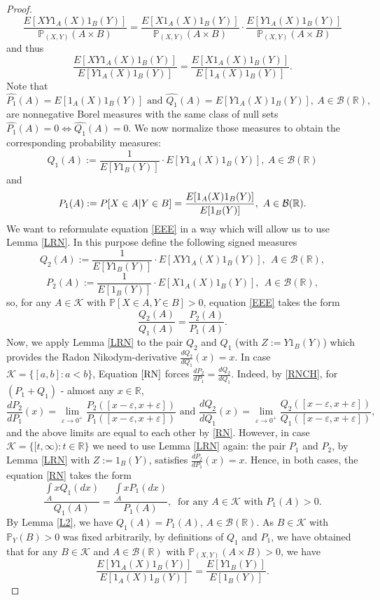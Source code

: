\documentclass[10pt,a4paper]{amsart}
\newcommand{\B}{\mathcal{B}(\R)}
\newcommand{\KK}{\mathcal{K}}
\newcommand{\PP}{\mathbb{P}}
\newcommand{\R}{\mathbb{R}}
\newcommand{\eps}{\varepsilon}
\begin{document}
\begin{proof}
$$\frac{E[XY1_A(X)1_B(Y)]}{\PP_{(X,Y)}(A\times B)}=\frac{E[X1_A(X)1_B(Y)]}{\PP_{(X,Y)}(A\times B)}\cdot \frac{E[Y1_A(X)1_B(Y)]}{\PP_{(X,Y)}(A\times B)}$$
and thus
\begin{equation}\label{EEE}
\frac{E[XY1_A(X)1_B(Y)]}{E[Y1_A(X)1_B(Y)]}=\frac{E[X1_A(X)1_B(Y)]}{E[1_A(X)1_B(Y)]}.
\end{equation}
 Note that 
$$\hat{P_1}(A)=E[1_A(X)1_B(Y)]\mbox{ and }\hat{Q_1}(A)= E[Y1_A(X)1_B(Y)],\ A\in\B,$$ are nonnegative Borel measures with the same class of null sets $\hat{P_1}(A)=0\Leftrightarrow\hat{Q_1}(A)=0$. We now normalize those measures to obtain the corresponding  probability measures:
$$Q_1(A):=\frac{1}{E[Y1_B(Y)]}\cdot E[Y1_A(X)1_B(Y)],\ A\in \B$$
and
$$P_1(A):=\\P[X\in A| Y\in B]=\frac{E[1_A(X)1_B(Y)]}{E[1_B(Y)]},\ A\in \B.$$
 We want to reformulate  equation \eqref{EEE} in a way which will allow us to use Lemma \ref{LRN}. In this purpose define the following signed measures
$$Q_2(A):= \frac{1}{E[Y1_B(Y)]}\cdot{E[XY1_A(X)1_B(Y)]},\ \ A\in\B,$$
$$P_2(A):=\frac{1}{E[1_B(Y)]}\cdot E[X1_A(X)1_B(Y)], \ \ A\in\B,$$
so,  for any $A\in\KK$ with $\PP[X\in A,Y\in B]>0$, equation \eqref{EEE} takes the form
\begin{equation}\label{RN}
\frac{Q_2(A)}{Q_1(A)}=\frac{P_2(A)}{P_1(A)}.
\end{equation}
Now, we apply Lemma \ref{LRN}  to the pair $Q_2$ and $Q_1$ (with $Z:=Y1_B(Y)$)  which provides  the Radon Nikodym-derivative $\frac{dQ_2}{dQ_1}(x)=x$. In case $\KK=\{[a,b]\colon a<b\}$, Equation $\eqref{RN}$ forces $\frac{dP_2}{dP_1}=\frac{dQ_2}{dQ_1}$. Indeed, by  \eqref{RNCH},  for  $(P_1+Q_1)$ - almost any $x\in\R$,
$$\frac{dP_2}{dP_1}(x)=\lim\limits_{\eps\to0^+}\frac{P_2([x-\eps,x+\eps])}{P_1([x-\eps,x+\eps])}\mbox{ and }\frac{dQ_2}{dQ_1}(x)=\lim\limits_{\eps\to0^+}\frac{Q_2([x-\eps,x+\eps])}{Q_1([x-\eps,x+\eps])},$$
and the above limits are equal to each other by \eqref{RN}. However,  in case $\KK=\{[t,\infty)\colon t\in\R\}$ we need to use Lemma \ref{LRN} again:  the pair $P_1$ and $P_2$, by Lemma \ref{LRN} with $Z:=1_B(Y)$, satisfies  $\frac{dP_2}{dP_1}(x)=x$. Hence, in both cases, the equation \eqref{RN} takes the form 
$$\frac{\int\limits_AxQ_1(dx)}{Q_1(A)}=\frac{\int\limits_AxP_1(dx)}{P_1(A)},\ \mbox{ for any } A\in\KK\mbox{ with }P_1(A)>0.$$
By Lemma \ref{L2}, we have $Q_1(A)=P_1(A)$, $A\in \B$. As $B\in\KK$ with $\PP_Y(B)>0$ was fixed arbitrarily, by definitions of $Q_1$ and $P_1$, we have obtained that for any $B\in\KK$ and  $A\in\B$ with $\PP_{(X,Y)}(A\times B)>0$, we have 
$$\frac{E[Y1_A(X)1_B(Y)]}{E[1_A(X)1_B(Y)]}=\frac{E[Y1_B(Y)]}{E[1_B(Y)]}.$$


\end{proof}
\end{document}
